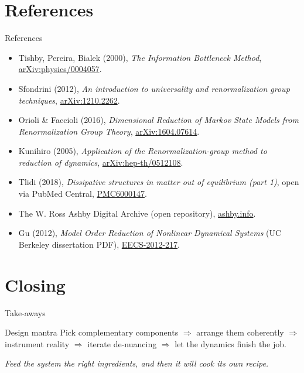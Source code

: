 \documentclass[presentation,aspectratio=169,11pt]{beamer}
\begin{document}
\section{References}

\begin{frame}{References}
\justifying
\footnotesize
\begin{itemize}
  \item Tishby, Pereira, Bialek (2000), \emph{The Information Bottleneck Method}, \href{https://arxiv.org/abs/physics/0004057}{arXiv:physics/0004057}.
  \item Sfondrini (2012), \emph{An introduction to universality and renormalization group techniques}, \href{https://arxiv.org/abs/1210.2262}{arXiv:1210.2262}.
  \item Orioli \& Faccioli (2016), \emph{Dimensional Reduction of Markov State Models from Renormalization Group Theory}, \href{https://arxiv.org/abs/1604.07614}{arXiv:1604.07614}.
  \item Kunihiro (2005), \emph{Application of the Renormalization-group method to reduction of dynamics}, \href{https://arxiv.org/abs/hep-th/0512108}{arXiv:hep-th/0512108}.
  \item Tlidi (2018), \emph{Dissipative structures in matter out of equilibrium (part 1)}, open via PubMed Central, \href{https://pmc.ncbi.nlm.nih.gov/articles/PMC6000147/}{PMC6000147}.
  \item The W. Ross Ashby Digital Archive (open repository), \href{https://ashby.info/}{ashby.info}.
  \item Gu (2012), \emph{Model Order Reduction of Nonlinear Dynamical Systems} (UC Berkeley dissertation PDF), \href{https://www2.eecs.berkeley.edu/Pubs/TechRpts/2012/EECS-2012-217.pdf}{EECS-2012-217}.
\end{itemize}
\end{frame}

\section{Closing}

\begin{frame}{Take-aways}
\justifying
\begin{block}{Design mantra}
\justifying
Pick complementary components $\Rightarrow$ arrange them coherently $\Rightarrow$ instrument reality $\Rightarrow$ iterate de-nuancing $\Rightarrow$ let the dynamics finish the job.
\end{block}

\vfill
\centering
\Large
\textit{Feed the system the right ingredients, and then it will cook its own recipe.}
\end{frame}
\end{document}
